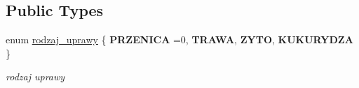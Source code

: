 \subsection*{Public Types}
\begin{DoxyCompactItemize}
\item 
\mbox{\label{class_c_pole_ae1a4d6f49c1d06a7bd4b1a2a7a1223fa}} 
enum \mbox{\hyperlink{class_c_pole_ae1a4d6f49c1d06a7bd4b1a2a7a1223fa}{rodzaj\+\_\+uprawy}} \{ {\bfseries P\+R\+Z\+E\+N\+I\+CA} =0, 
{\bfseries T\+R\+A\+WA}, 
{\bfseries Z\+Y\+TO}, 
{\bfseries K\+U\+K\+U\+R\+Y\+D\+ZA}
 \}
\begin{DoxyCompactList}\small\item\em rodzaj uprawy \end{DoxyCompactList}\end{DoxyCompactItemize}
